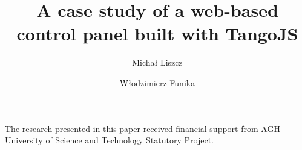 \documentclass[10pt]{article}
\begin{document}
\begin{opening}

\title{A case study of a web-based control panel built with TangoJS}

\author[liszcz.michal@gmail.com]{Michał Liszcz}

\author[AGH University of Science and Technology, ACC CYFRONET AGH, Kraków, Poland, funika@agh.edu.pl]{Włodzimierz Funika}

\begin{abstract}
    
\end{abstract}


\end{opening}

\tikzset{font=\Large}



\begin{acknowledgements}
The research presented in this paper received financial support from AGH University of Science and Technology Statutory Project.
\end{acknowledgements}



\end{document}
